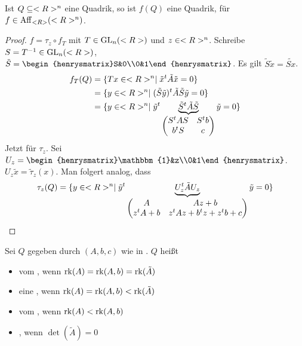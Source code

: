 \begin{lemma}
	Ist $Q\subseteq<R>^n$ eine Quadrik, so ist $f(Q)$ eine Quadrik, für $f\in\operatorname{Aff}_{<R>}(<R>^n)$.
\end{lemma}
\begin{proof}
	$f=\tau_z\circ f_T$ mit $T\in\operatorname{GL}_n(<R>)$ und $z\in<R>^n$. Schreibe $S=T^{-1}\in\operatorname{GL}_n(<R>)$, $\tilde{S}=\begin{henrysmatrix}S&0\\0&1\end{henrysmatrix}$. Es gilt $\tilde{S}\tilde{x}=\widetilde{Sx}$.
	\begin{align}
		f_T(Q)&=\{Tx\in<R>^n\mid \tilde{x}^t\tilde{A}\tilde{x}=0\}\notag \\
		&=\{y\in<R>^n\mid (\tilde{S}\tilde{y})^t\tilde{A}\tilde{S}\tilde{y}=0\}\notag \\
		&=\{y\in<R>^n\mid \tilde{y}^t\underbrace{\tilde{S}^t\tilde{A}\tilde{S}}_{\begin{pmatrix}S^tAS&S^tb\\b^tS&c\end{pmatrix}}\tilde{y}=0\}\notag
	\end{align}
	Jetzt für $\tau_z$. Sei $U_z=\begin{henrysmatrix}\mathbbm{1}&z\\0&1\end{henrysmatrix}$. $U_z\tilde{x}=\tilde{\tau}_z(x)$. Man folgert analog, dass 
	\begin{align}
		\tau_z(Q)=\{y\in<R>^n\mid \tilde{y}^t\underbrace{U_z^t\tilde{A}U_z}_{\begin{pmatrix} A&Az+b\\z^tA+b&z^tAz+b^tz+z^tb+c\end{pmatrix}}\tilde{y}=0\}\notag
	\end{align}
\end{proof}

\begin{definition}
	Sei $Q$ gegeben durch $(A,b,c)$ wie in . $Q$ heißt
	\begin{itemize}
		\item vom , wenn $\operatorname{rk}(A)=\operatorname{rk}(A,b)=\operatorname{rk}(\tilde{A})$
		\item eine , wenn $\operatorname{rk}(A)=\operatorname{rk}(A,b)<\operatorname{rk}(\tilde{A})$
		\item vom , wenn $\operatorname{rk}(A)<\operatorname{rk}(A,b)$
		\item {}, wenn $\det(\tilde{A})=0$
	\end{itemize}
\end{definition}

